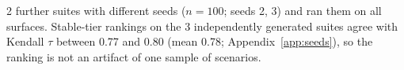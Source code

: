2 further suites with different seeds ($n{=}100$; seeds 2, 3) and ran them on all surfaces. Stable-tier rankings on the 3 independently generated suites agree with Kendall $\tau$ between 0.77 and 0.80 (mean 0.78; Appendix~\ref{app:seeds}), so the ranking is not an artifact of one sample of scenarios.
